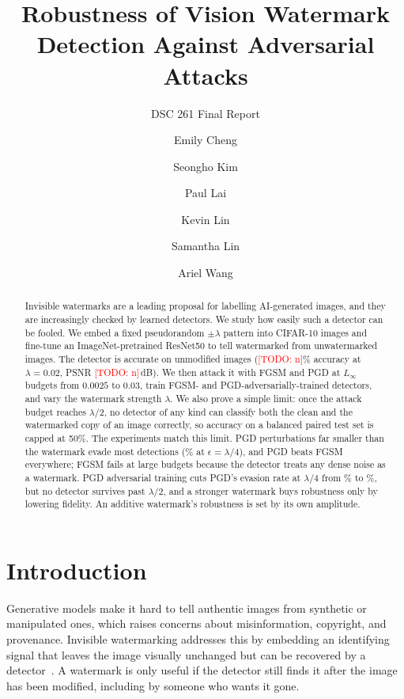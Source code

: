 \documentclass[sigconf, nonacm]{acmart}
\newcommand{\todo}[1]{\textcolor{red}{[TODO: #1]}}
\providecommand{\BaseAcc}{\todo{n}}\providecommand{\BaseTPR}{\todo{n}}\providecommand{\BaseFPR}{\todo{n}}
\providecommand{\BasePSNR}{\todo{n}}\providecommand{\RunDevice}{\todo{GPU}}
\begin{document}
\title{Robustness of Vision Watermark Detection Against Adversarial Attacks}
\subtitle{DSC 261 Final Report}

\author{Emily Cheng}\affiliation{\institution{}\city{}\state{}\country{}}
\author{Seongho Kim}\affiliation{\institution{}\city{}\state{}\country{}}
\author{Paul Lai}\affiliation{\institution{}\city{}\state{}\country{}}
\author{Kevin Lin}\affiliation{\institution{}\city{}\state{}\country{}}
\author{Samantha Lin}\affiliation{\institution{}\city{}\state{}\country{}}
\author{Ariel Wang}\affiliation{\institution{}\city{}\state{}\country{}}

\begin{abstract}
Invisible watermarks are a leading proposal for labelling AI-generated images, and they are
increasingly checked by learned detectors. We study how easily such a detector can be fooled.
We embed a fixed pseudorandom $\pm\lambda$ pattern into CIFAR-10 images and fine-tune an
ImageNet-pretrained ResNet50 to tell watermarked from unwatermarked images. The detector is
accurate on unmodified images (\BaseAcc\% accuracy at $\lambda=0.02$, PSNR \BasePSNR\,dB). We then
attack it with FGSM and PGD at $L_\infty$ budgets from $0.0025$ to $0.03$, train FGSM- and
PGD-adversarially-trained detectors, and vary the watermark strength $\lambda$. We also prove a
simple limit: once the attack budget reaches $\lambda/2$, no detector of any kind can classify
both the clean and the watermarked copy of an image correctly, so accuracy on a balanced
paired test set is capped at 50\%. The experiments match this limit. PGD perturbations far smaller
than the watermark evade most detections (\BasePgdAsrB\% at $\epsilon=\lambda/4$), and PGD beats
FGSM everywhere; FGSM fails at large budgets because the detector treats any dense noise as a
watermark. PGD adversarial training cuts PGD's evasion rate at $\lambda/4$ from \BasePgdAsrB\% to
\PatAPgdAsrB\%, but no detector survives past $\lambda/2$, and a stronger watermark buys robustness
only by lowering fidelity. An additive watermark's robustness is set by its own amplitude.
\end{abstract}

\maketitle

\section{Introduction}
Generative models make it hard to tell authentic images from synthetic or manipulated ones,
which raises concerns about misinformation, copyright, and provenance. Invisible watermarking
addresses this by embedding an identifying signal that leaves the image visually unchanged but
can be recovered by a detector~\cite{paper4,paper5,paper6}. A watermark is only useful if the
detector still finds it after the image has been modified, including by someone who wants it gone.
\end{document}

